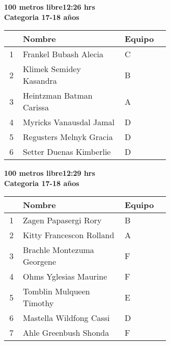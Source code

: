 \begin{minipage}{0.95\linewidth}\vspace{0.5cm} 
\begin{flushleft}
\textbf{
\hspace{-0.15cm}100 metros libre\hspace{1.5cm}12:26 hrs \\Categoria 17-18 años}\vspace{-0.2cm} 
\end{flushleft}
\begin{tabular}{cp{0.63\linewidth}l}
\hline
& \textbf{Nombre} & \textbf{Equipo} \\ \hline
1 & Frankel Bubash Alecia & C \\ 
2 & Klimek Semidey Kasandra & B \\ 
3 & Heintzman Batman Carissa & A \\ 
4 & Myricks Vanausdal Jamal & D \\ 
5 & Regusters Melnyk Gracia & D \\ 
6 & Setter Duenas Kimberlie & D \\ 
\end{tabular}
\end{minipage}
\begin{minipage}{0.95\linewidth}\vspace{0.5cm} 
\begin{flushleft}
\textbf{
\hspace{-0.15cm}100 metros libre\hspace{1.5cm}12:29 hrs \\Categoria 17-18 años}\vspace{-0.2cm} 
\end{flushleft}
\begin{tabular}{cp{0.63\linewidth}l}
\hline
& \textbf{Nombre} & \textbf{Equipo} \\ \hline
1 & Zagen Papasergi Rory & B \\ 
2 & Kitty Francescon Rolland & A \\ 
3 & Brachle Montezuma Georgene & F \\ 
4 & Ohms Yglesias Maurine & F \\ 
5 & Tomblin Mulqueen Timothy & E \\ 
6 & Mastella Wildfong Cassi & D \\ 
7 & Ahle Greenbush Shonda & F \\ 
\end{tabular}
\end{minipage}
